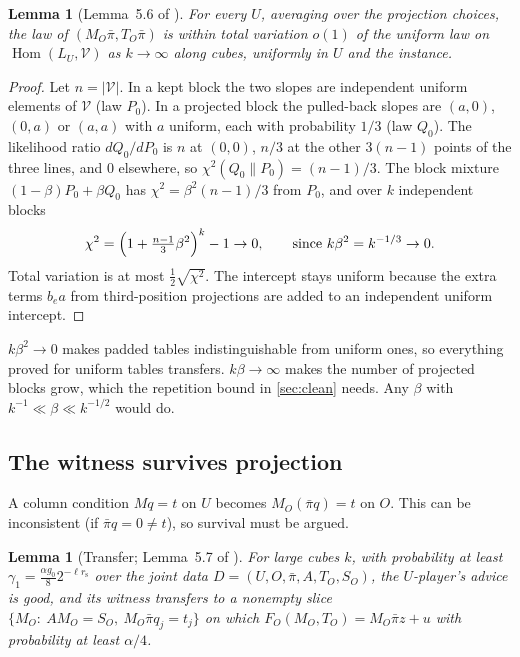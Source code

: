 \documentclass[11pt]{article}
\newtheorem{lemma}[theorem]{Lemma}
\theoremstyle{definition}
\theoremstyle{remark}
\newcommand{\V}{\mathcal V}
\newcommand{\rs}{r_{\mathrm s}}
\newcommand{\bpi}{\bar\pi}
\DeclareMathOperator{\Hom}{Hom}
\newcommand{\abs}[1]{\lvert #1\rvert}
\begin{document}
\begin{lemma}[Lemma~5.6 of \cite{OpenAI-UGC}]\label{lem:tv}
For every $U$, averaging over the projection choices, the law of
$(M_O\bpi,T_O\bpi)$ is within total variation $o(1)$ of the uniform law on
$\Hom(L_U,\V)$ as $k\to\infty$ along cubes, uniformly in $U$ and the instance.
\end{lemma}

\begin{proof}
Let $n=\abs\V$. In a kept block the two slopes are independent uniform elements
of $\V$ (law $P_0$). In a projected block the pulled-back slopes are
$(a,0)$, $(0,a)$ or $(a,a)$ with $a$ uniform, each with probability $1/3$
(law $Q_0$). The likelihood ratio $dQ_0/dP_0$ is $n$ at $(0,0)$, $n/3$
at the other $3(n-1)$ points of the three lines, and $0$ elsewhere, so
$\chi^2(Q_0\|P_0)=(n-1)/3$. The block mixture $(1-\beta)P_0+\beta Q_0$ has
$\chi^2=\beta^2(n-1)/3$ from $P_0$, and over $k$ independent blocks
\[
\chi^2=\Bigl(1+\tfrac{n-1}{3}\beta^2\Bigr)^k-1\to0,\qquad\text{since }k\beta^2=k^{-1/3}\to0 .
\]
Total variation is at most $\frac12\sqrt{\chi^2}$. The intercept stays uniform
because the extra terms $b_ea$ from third-position projections are added to an
independent uniform intercept.
\end{proof}

\begin{idea}[The two jobs of $\beta=k^{-2/3}$.]
$k\beta^2\to0$ makes padded tables indistinguishable from uniform ones, so
everything proved for uniform tables transfers. $k\beta\to\infty$ makes the
number of projected blocks grow, which the repetition bound in
\cref{sec:clean} needs. Any $\beta$ with $k^{-1}\ll\beta\ll k^{-1/2}$ would
do.
\end{idea}

\subsection{The witness survives projection}

A column condition $Mq=t$ on $U$ becomes $M_O(\bpi q)=t$ on $O$. This can be
inconsistent (if $\bpi q=0\ne t$), so survival must be argued.

\begin{lemma}[Transfer; Lemma~5.7 of \cite{OpenAI-UGC}]\label{lem:transfer}
For large cubes $k$, with probability at least
$\gamma_1=\frac{\alpha g_0}{8}2^{-\ell\rs}$ over the joint data
$D=(U,O,\bpi,A,T_O,S_O)$, the $U$-player's advice is good, and its witness
transfers to a nonempty slice $\{M_O:\ AM_O=S_O,\ M_O\bpi q_j=t_j\}$ on which
$F_O(M_O,T_O)=M_O\bpi z+u$ with probability at least $\alpha/4$.
\end{lemma}
\end{document}
